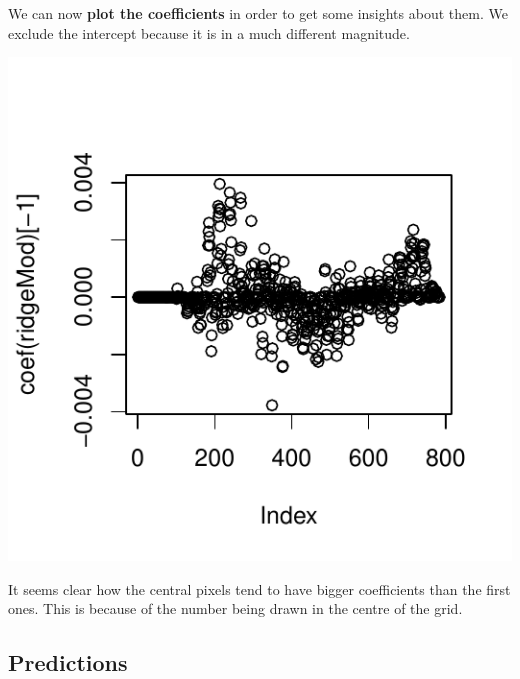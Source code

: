 \documentclass[
  10pt,
]{article}
\newenvironment{Shaded}{\begin{snugshade}}{\end{snugshade}}
\newcommand{\AttributeTok}[1]{\textcolor[rgb]{0.13,0.29,0.53}{#1}}
\newcommand{\ConstantTok}[1]{\textcolor[rgb]{0.56,0.35,0.01}{#1}}
\newcommand{\DecValTok}[1]{\textcolor[rgb]{0.00,0.00,0.81}{#1}}
\newcommand{\FloatTok}[1]{\textcolor[rgb]{0.00,0.00,0.81}{#1}}
\newcommand{\FunctionTok}[1]{\textcolor[rgb]{0.13,0.29,0.53}{\textbf{#1}}}
\newcommand{\NormalTok}[1]{#1}
\newcommand{\OtherTok}[1]{\textcolor[rgb]{0.56,0.35,0.01}{#1}}
\newcommand{\SpecialCharTok}[1]{\textcolor[rgb]{0.81,0.36,0.00}{\textbf{#1}}}
\newcommand{\StringTok}[1]{\textcolor[rgb]{0.31,0.60,0.02}{#1}}
\begin{document}
\begin{Shaded}
\end{Shaded}

We can now \textbf{plot the coefficients} in order to get some insights
about them. We exclude the intercept because it is in a much different
magnitude.

\begin{center}\includegraphics{Task1_files/figure-latex/plot-1} \end{center}

It seems clear how the central pixels tend to have bigger coefficients
than the first ones. This is because of the number being drawn in the
centre of the grid.

\hypertarget{predictions}{%
\subsection{Predictions}\label{predictions}}
\end{document}
